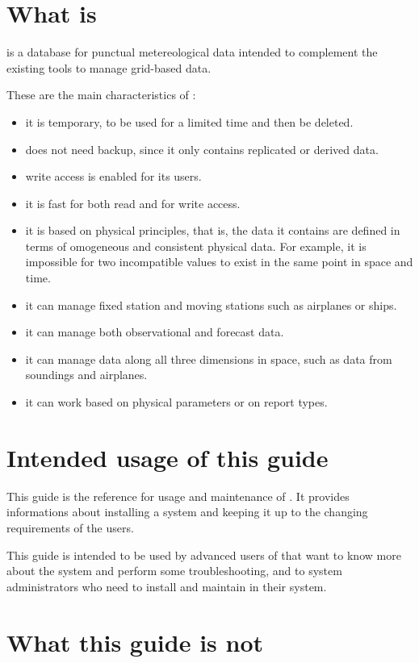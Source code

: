 \section{What is \dballe{} }

\dballe{} is a database for punctual metereological data intended to complement
the existing tools to manage grid-based data.

These are the main characteristics of \dballe{}:

\begin{itemize}
\item it is temporary, to be used for a limited time and then be deleted.
\item does not need backup, since it only contains replicated or derived data.
\item write access is enabled for its users.
\item it is fast for both read and for write access.
\item it is based on physical principles, that is, the data it contains are
      defined in terms of omogeneous and consistent physical data.  For
      example, it is impossible for two incompatible values to exist in the
      same point in space and time.
\item it can manage fixed station and moving stations such as airplanes or
      ships.
\item it can manage both observational and forecast data.
\item it can manage data along all three dimensions in space, such as data from
      soundings and airplanes.
\item it can work based on physical parameters or on report types.
\end{itemize}


\section{Intended usage of this guide}

This guide is the reference for usage and maintenance of \dballe{}.  It
provides informations about installing a \dballe{} system and keeping it up to
the changing requirements of the users.

This guide is intended to be used by advanced users of \dballe{} that want to
know more about the system and perform some troubleshooting, and to system
administrators who need to install and maintain \dballe{} in their system.

\section{What this guide is not}

